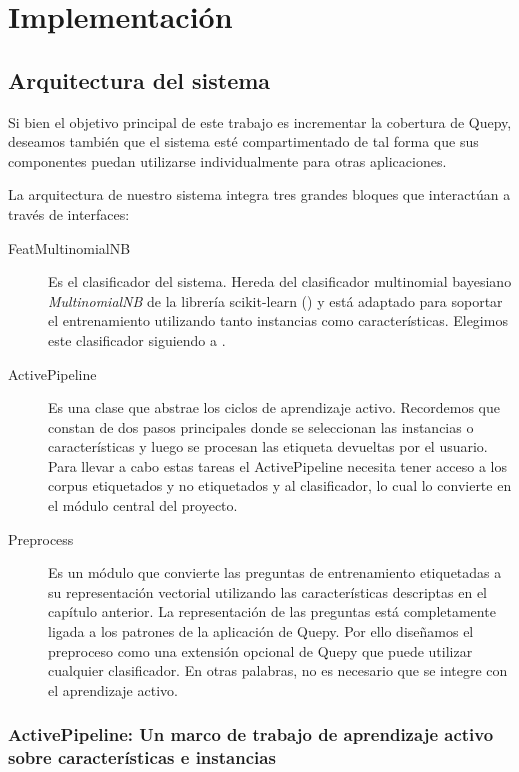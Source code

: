 \chapter{Implementación}\label{implementacion}

\section{Arquitectura del sistema}
Si bien el objetivo principal de este trabajo es incrementar la cobertura de Quepy, deseamos también que el sistema esté compartimentado de tal forma que sus componentes puedan utilizarse individualmente para otras aplicaciones.

La arquitectura de nuestro sistema integra tres grandes bloques que interactúan a través de interfaces:

\begin{description}
    \item[FeatMultinomialNB] Es el clasificador del sistema. Hereda del clasificador multinomial bayesiano \textit{MultinomialNB} de la librería scikit-learn (\citet{scikit-learn}) y está adaptado para soportar el entrenamiento utilizando tanto instancias como características. Elegimos este clasificador siguiendo a \citet{dualist}.
    \item[ActivePipeline] Es una clase que abstrae los ciclos de aprendizaje activo. Recordemos que constan de dos pasos principales donde se seleccionan las instancias o características y luego se procesan las etiqueta devueltas por el usuario. Para llevar a cabo estas tareas el ActivePipeline necesita tener acceso a los corpus etiquetados y no etiquetados y al clasificador, lo cual lo convierte en el módulo central del proyecto.
    \item[Preprocess] Es un módulo que convierte las preguntas de entrenamiento etiquetadas a su representación vectorial utilizando las características descriptas en el capítulo anterior. La representación de las preguntas está completamente ligada a los patrones de la aplicación de Quepy. Por ello diseñamos el preproceso como una extensión opcional de Quepy que puede utilizar cualquier clasificador. En otras palabras, no es necesario que se integre con el aprendizaje activo.
\end{description}

\subsection{ActivePipeline: Un marco de trabajo de aprendizaje activo sobre características e instancias}

